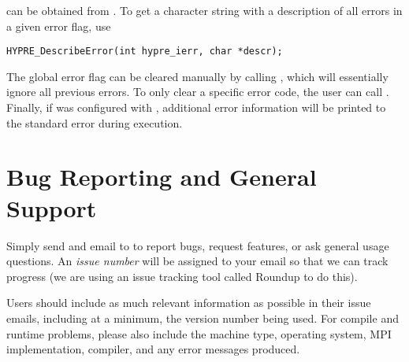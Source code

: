 can be obtained from .  To get a character string
with a description of all errors in a given error flag, use
\begin{display} \begin{verbatim}
HYPRE_DescribeError(int hypre_ierr, char *descr);
\end{verbatim} \end{display}
The global error flag can be cleared manually by calling
, which will essentially ignore all previous
\hypre{} errors. To only clear a specific error code, the user can call
.
Finally, if \hypre{} was configured with , additional
error information will be printed to the standard error during execution.


\section{Bug Reporting and General Support}

Simply send and email to  to report bugs, request
features, or ask general usage questions.  An {\em issue number} will be
assigned to your email so that we can track progress (we are using an issue
tracking tool called Roundup to do this).

Users should include as much relevant information as possible in their issue
emails, including at a minimum, the \hypre{} version number being used.  For
compile and runtime problems, please also include the machine type, operating
system, MPI implementation, compiler, and any error messages produced.



